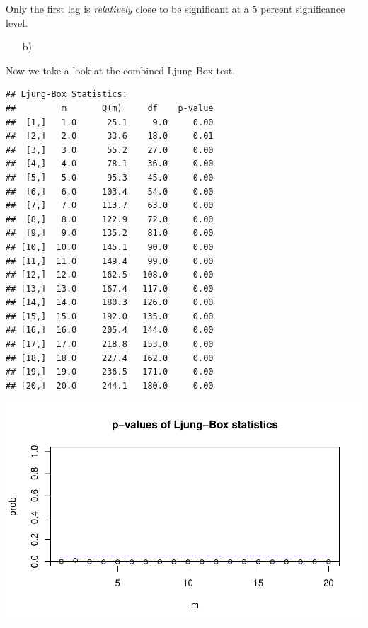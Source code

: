 \documentclass[12pt,a4paper]{article}
\newenvironment{Shaded}{\begin{snugshade}}{\end{snugshade}}
\newcommand{\DataTypeTok}[1]{\textcolor[rgb]{0.13,0.29,0.53}{#1}}
\newcommand{\DecValTok}[1]{\textcolor[rgb]{0.00,0.00,0.81}{#1}}
\newcommand{\KeywordTok}[1]{\textcolor[rgb]{0.13,0.29,0.53}{\textbf{#1}}}
\newcommand{\NormalTok}[1]{#1}
\newcommand{\OperatorTok}[1]{\textcolor[rgb]{0.81,0.36,0.00}{\textbf{#1}}}
\begin{document}
Only the first lag is \emph{relatively} close to be significant at a 5
percent significance level.

\begin{itemize}
  \item[b)] $\quad$
\end {itemize}

Now we take a look at the combined Ljung-Box test.

\begin{Shaded}
\end{Shaded}

\begin{verbatim}
## Ljung-Box Statistics:  
##         m       Q(m)     df    p-value
##  [1,]   1.0      25.1     9.0     0.00
##  [2,]   2.0      33.6    18.0     0.01
##  [3,]   3.0      55.2    27.0     0.00
##  [4,]   4.0      78.1    36.0     0.00
##  [5,]   5.0      95.3    45.0     0.00
##  [6,]   6.0     103.4    54.0     0.00
##  [7,]   7.0     113.7    63.0     0.00
##  [8,]   8.0     122.9    72.0     0.00
##  [9,]   9.0     135.2    81.0     0.00
## [10,]  10.0     145.1    90.0     0.00
## [11,]  11.0     149.4    99.0     0.00
## [12,]  12.0     162.5   108.0     0.00
## [13,]  13.0     167.4   117.0     0.00
## [14,]  14.0     180.3   126.0     0.00
## [15,]  15.0     192.0   135.0     0.00
## [16,]  16.0     205.4   144.0     0.00
## [17,]  17.0     218.8   153.0     0.00
## [18,]  18.0     227.4   162.0     0.00
## [19,]  19.0     236.5   171.0     0.00
## [20,]  20.0     244.1   180.0     0.00
\end{verbatim}

\includegraphics{exercise_1_files/figure-latex/unnamed-chunk-6-1.pdf}
\end{document}
